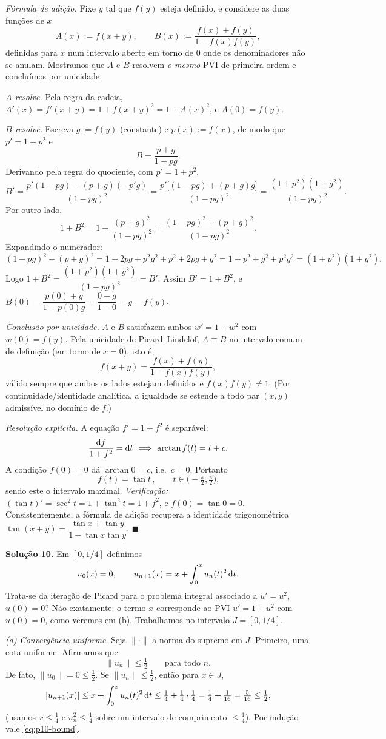 \emph{Fórmula de adição.} Fixe $y$ tal que $f(y)$ esteja definido, e considere as duas funções de $x$
\[
A(x):=f(x+y),\qquad B(x):=\frac{f(x)+f(y)}{1-f(x)f(y)},
\]
definidas para $x$ num intervalo aberto em torno de $0$ onde os denominadores não se anulam. Mostramos que $A$ e $B$ resolvem \emph{o mesmo} PVI de primeira ordem e concluímos por unicidade.

\emph{$A$ resolve.} Pela regra da cadeia, $A'(x)=f'(x+y)=1+f(x+y)^2=1+A(x)^2$, e $A(0)=f(y)$.

\emph{$B$ resolve.} Escreva $g:=f(y)$ (constante) e $p(x):=f(x)$, de modo que $p'=1+p^2$ e
\[
B=\frac{p+g}{1-pg}.
\]
Derivando pela regra do quociente, com $p'=1+p^2$,
\[
B'=\frac{p'(1-pg)-(p+g)(-p'g)}{(1-pg)^2}
=\frac{p'\big[(1-pg)+(p+g)g\big]}{(1-pg)^2}
=\frac{(1+p^2)(1+g^2)}{(1-pg)^2}.
\]
Por outro lado,
\[
1+B^2=1+\frac{(p+g)^2}{(1-pg)^2}=\frac{(1-pg)^2+(p+g)^2}{(1-pg)^2}.
\]
Expandindo o numerador:
\[
(1-pg)^2+(p+g)^2=1-2pg+p^2g^2+p^2+2pg+g^2=1+p^2+g^2+p^2g^2=(1+p^2)(1+g^2).
\]
Logo $1+B^2=\dfrac{(1+p^2)(1+g^2)}{(1-pg)^2}=B'$. Assim $B'=1+B^2$, e $B(0)=\dfrac{p(0)+g}{1-p(0)g}=\dfrac{0+g}{1-0}=g=f(y)$.

\emph{Conclusão por unicidade.} $A$ e $B$ satisfazem ambos $w'=1+w^2$ com $w(0)=f(y)$. Pela unicidade de Picard--Lindelöf, $A\equiv B$ no intervalo comum de definição (em torno de $x=0$), isto é,
\[
f(x+y)=\frac{f(x)+f(y)}{1-f(x)f(y)},
\]
válido sempre que ambos os lados estejam definidos e $f(x)f(y)\neq1$. (Por continuidade/identidade analítica, a igualdade se estende a todo par $(x,y)$ admissível no domínio de $f$.)

\emph{Resolução explícita.} A equação $f'=1+f^2$ é separável:
\[
\frac{\d f}{1+f^2}=\d t\ \Longrightarrow\ \arctan f(t)=t+c .
\]
A condição $f(0)=0$ dá $\arctan0=c$, i.e.\ $c=0$. Portanto
\[
\boxed{\,f(t)=\tan t\,},\qquad t\in\Big(-\tfrac\pi2,\tfrac\pi2\Big),
\]
sendo este o intervalo maximal. \emph{Verificação:} $(\tan t)'=\sec^2 t=1+\tan^2 t=1+f^2$, e $f(0)=\tan0=0$. Consistentemente, a fórmula de adição recupera a identidade trigonométrica $\tan(x+y)=\dfrac{\tan x+\tan y}{1-\tan x\tan y}$.
\qquad$\blacksquare$


\bigskip\noindent\textbf{Solução 10.}\quad
Em $[0,1/4]$ definimos
\[
u_0(x)=0,\qquad u_{n+1}(x)=x+\int_0^x u_n(t)^2\,\mathrm{d} t .
\]
Trata-se da iteração de Picard para o problema integral associado a $u'=u^2$, $u(0)=0$? Não exatamente: o termo $x$ corresponde ao PVI $u'=1+u^2$ com $u(0)=0$, como veremos em (b). Trabalhamos no intervalo $J=[0,1/4]$.

\emph{(a) Convergência uniforme.}
Seja $\|\cdot\|$ a norma do supremo em $J$. Primeiro, uma cota uniforme. Afirmamos que
\begin{equation}\label{eq:p10-bound}
\|u_n\|\le \tfrac12\qquad\text{para todo }n .
\end{equation}
De fato, $\|u_0\|=0\le\tfrac12$. Se $\|u_n\|\le\tfrac12$, então para $x\in J$,
\[
|u_{n+1}(x)|\le x+\int_0^x u_n(t)^2\,\mathrm{d} t\le \tfrac14+\tfrac14\cdot\tfrac14=\tfrac14+\tfrac1{16}=\tfrac5{16}\le\tfrac12 ,
\]
(usamos $x\le\tfrac14$ e $u_n^2\le\tfrac14$ sobre um intervalo de comprimento $\le\tfrac14$). Por indução vale \eqref{eq:p10-bound}.

